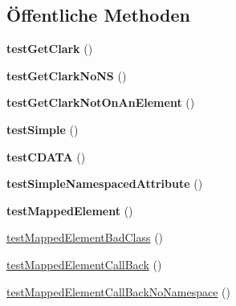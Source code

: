 \subsection*{Öffentliche Methoden}
\begin{DoxyCompactItemize}
\item 
\mbox{\label{class_sabre_1_1_xml_1_1_reader_test_ad8115ab65884e6851026971896a63c08}} 
{\bfseries test\+Get\+Clark} ()
\item 
\mbox{\label{class_sabre_1_1_xml_1_1_reader_test_abe2a93c647501dcfe1dc49e754e7ac59}} 
{\bfseries test\+Get\+Clark\+No\+NS} ()
\item 
\mbox{\label{class_sabre_1_1_xml_1_1_reader_test_ae691c4419cfb411026e73bda5465b8e3}} 
{\bfseries test\+Get\+Clark\+Not\+On\+An\+Element} ()
\item 
\mbox{\label{class_sabre_1_1_xml_1_1_reader_test_a859434829880f89c2532d8655c253ebb}} 
{\bfseries test\+Simple} ()
\item 
\mbox{\label{class_sabre_1_1_xml_1_1_reader_test_a92f882e1ec60894ef34d466bcb53a05b}} 
{\bfseries test\+C\+D\+A\+TA} ()
\item 
\mbox{\label{class_sabre_1_1_xml_1_1_reader_test_aac75619c6d1f02b99e3827ec3b687f42}} 
{\bfseries test\+Simple\+Namespaced\+Attribute} ()
\item 
\mbox{\label{class_sabre_1_1_xml_1_1_reader_test_ad0c7dd7eabccf0bca85f1aae679cdf90}} 
{\bfseries test\+Mapped\+Element} ()
\item 
\mbox{\hyperlink{class_sabre_1_1_xml_1_1_reader_test_a80e2c334fdd6d987161e942b07ae60f8}{test\+Mapped\+Element\+Bad\+Class}} ()
\item 
\mbox{\hyperlink{class_sabre_1_1_xml_1_1_reader_test_aa9b25ecc0b01c88a140831ce15f0f9a4}{test\+Mapped\+Element\+Call\+Back}} ()
\item 
\mbox{\hyperlink{class_sabre_1_1_xml_1_1_reader_test_ad3047108a43b360a7d0d492033399481}{test\+Mapped\+Element\+Call\+Back\+No\+Namespace}} ()
\item 

\end{DoxyCompactItemize}
